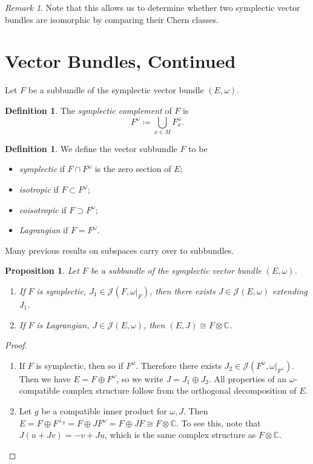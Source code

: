 \documentclass[leqno, openany]{memoir}
\newtheorem{prop}[thm]{Proposition}
\theoremstyle{definition}
\newtheorem{defn}[thm]{Definition}
\theoremstyle{remark}
\newtheorem{rmk}[thm]{Remark}
\theoremstyle{plain}
\theoremstyle{definition}
\theoremstyle{remark}
\newcommand{\C}{\mathbb{C}}
\newcommand{\mc}[1]{\mathcal{#1}}
\begin{document}
\begin{rmk}
    Note that this allows us to determine whether two symplectic vector bundles are isomorphic by comparing their Chern classes.
\end{rmk}

\section{Vector Bundles, Continued}%
\label{sec:vector_bundles_continued}

Let $F$ be a subbundle of the symplectic vector bundle $(E, \omega)$.

\begin{defn}
    The \textit{symplectic complement} of $F$ is
    \[ F^{\omega} \coloneqq \bigcup_{x \in M} F_x^{\omega}. \]
\end{defn}

\begin{defn}
    We define the vector subbundle $F$ to be
    \begin{itemize}
        \item \textit{symplectic} if $F \cap F^{\omega}$ is the zero section of $E$;
        \item \textit{isotropic} if $F \subset F^{\omega}$;
        \item \textit{coisotropic} if $F \supset F^{\omega}$;
        \item \textit{Lagrangian} if $F = F^{\omega}$.
    \end{itemize}
\end{defn}
Many previous results on subspaces carry over to subbundles.

\begin{prop}
    Let $F$ be a subbundle of the symplectic vector bundle $(E, \omega)$.
    \begin{enumerate}
        \item If $F$ is symplectic, $J_1 \in \mc{J}(F, \omega|_F)$, then there exists $J \in \mc{J}(E, \omega)$ extending $J_1$.
        \item If $F$ is Lagrangian, $J \in \mc{J}(E, \omega)$, then $(E, J) \cong F \otimes \C$.
    \end{enumerate}
\end{prop}

\begin{proof}
    \begin{enumerate}
        \item If $F$ is symplectic, then so if $F^{\omega}$. Therefore there exists $J_2 \in \mc{J}(F^{\omega}, \omega|_{F^{\omega}})$. Then we have $E = F \oplus F^{\omega}$, so we write $J = J_1 \oplus J_2$. All properties of an $\omega$-compatible complex structure follow from the orthogonal decomposition of $E$.
        \item Let $g$ be a compatible inner product for $\omega, J$. Then $E = F \oplus F^{\perp_g} = F \oplus JF^{\omega} = F \oplus JF \cong F \otimes \C$. To see this, note that $J(u + Jv) = -v + Ju$, which is the same complex structure as $F \otimes \C$. \qedhere
    \end{enumerate}
\end{proof}
\end{document}
